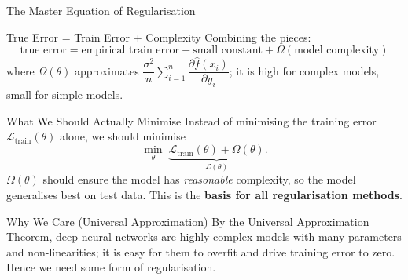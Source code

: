 \documentclass{beamer}
\begin{document}
\begin{frame}[shrink=10]{The Master Equation of Regularisation}
  \begin{block}{True Error = Train Error + Complexity}
    Combining the pieces:
    \[
      \boxed{\;
        \text{true error}
          = \text{empirical train error}
            + \text{small constant}
            + \Omega(\text{model complexity})
      \;}
    \]
    where $\Omega(\theta)$ approximates
    $\dfrac{\sigma^2}{n}\sum_{i=1}^{n}\dfrac{\partial\hat f(x_i)}{\partial y_i}$;
    it is high for complex models, small for simple models.
  \end{block}

  \begin{block}{What We Should Actually Minimise}
    Instead of minimising the training error $\mathcal L_{\text{train}}(\theta)$
    alone, we should minimise
    \[
      \min_{\theta}\;
        \underbrace{\mathcal L_{\text{train}}(\theta) + \Omega(\theta)}_{\mathcal L(\theta)}.
    \]
    $\Omega(\theta)$ should ensure the model has \emph{reasonable}
    complexity, so the model generalises best on test data. This is the
    \textbf{basis for all regularisation methods}.
  \end{block}

  \begin{alertblock}{Why We Care (Universal Approximation)}
    By the Universal Approximation Theorem, deep neural networks are highly
    complex models with many parameters and non-linearities; it is easy for
    them to overfit and drive training error to zero. Hence we need some
    form of regularisation.
  \end{alertblock}
\end{frame}
\end{document}
